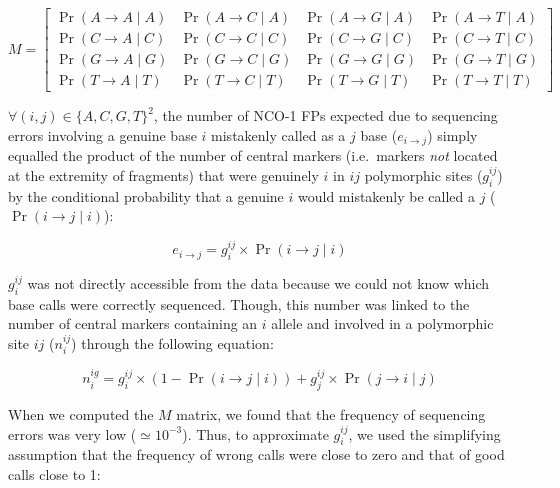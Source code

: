 \begin{equation*}
M = \begin{bmatrix}
\Pr( A\rightarrow A \mid A) & \Pr( A\rightarrow C \mid A) & \Pr( A\rightarrow G \mid A) & \Pr( A\rightarrow T \mid A) \\
\Pr( C\rightarrow A \mid C) & \Pr( C\rightarrow C \mid C) & \Pr( C\rightarrow G \mid C) & \Pr( C\rightarrow T \mid C) \\
\Pr( G\rightarrow A \mid G) & \Pr( G\rightarrow C \mid G) & \Pr( G\rightarrow G \mid G) & \Pr( G\rightarrow T \mid G) \\
\Pr( T\rightarrow A \mid T) & \Pr( T\rightarrow C \mid T) & \Pr( T\rightarrow G \mid T) & \Pr( T\rightarrow T \mid T) 
\end{bmatrix}
\end{equation*}




\newpage


$\forall (i,j) \in \{A, C, G, T\}^2$, the number of NCO-1 FPs expected due to sequencing errors involving a genuine base $i$ mistakenly called as a $j$ base ($e_{i\rightarrow j}$) simply equalled the product of the number of central markers (i.e.\ markers \textit{not} located at the extremity of fragments) that were genuinely $i$ in $ij$ polymorphic sites ($g_{i}^{ij}$) by the conditional probability that a genuine $i$ would mistakenly be called a $j$ ($\Pr( i\rightarrow j \mid i )$):

\begin{equation} \label{eq:nb-errors}
	e_{i\rightarrow j} = g_{i}^{ij} \times \Pr( i\rightarrow j \mid i )
\end{equation}


$g_{i}^{ij}$ was not directly accessible from the data because we could not know which base calls were correctly sequenced.
Though, this number was linked to the number of central markers containing an $i$ allele and involved in a polymorphic site $ij$ ($n_{i}^{ij}$) through the following equation:

\begin{equation} \label{eq:genuine-to-called}
	n_{i}^{ig} = g_{i}^{ij} \times ( 1 - \Pr( i\rightarrow j \mid i ) ) + g_{j}^{ij} \times \Pr( j\rightarrow i \mid j )
\end{equation}


When we computed the $M$ matrix, we found that the frequency of sequencing errors was very low ($\simeq 10^{-3}$).
Thus, to approximate $g_{i}^{ij}$, we used the simplifying assumption that the frequency of wrong calls were close to zero and that of good calls close to 1:

